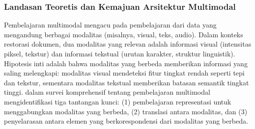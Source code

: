 \documentclass[12pt,a4paper]{article}
\begin{document}
\subsubsection{Landasan Teoretis dan Kemajuan Arsitektur Multimodal}
\label{subsubsec:theoretical-foundation-multimodal}
Pembelajaran multimodal mengacu pada pembelajaran dari data yang mengandung berbagai modalitas (misalnya, visual, teks, audio). Dalam konteks restorasi dokumen, dua modalitas yang relevan adalah informasi visual (intensitas piksel, tekstur) dan informasi tekstual (urutan karakter, struktur linguistik). Hipotesis inti adalah bahwa modalitas yang berbeda memberikan informasi yang saling melengkapi: modalitas visual mendeteksi fitur tingkat rendah seperti tepi dan tekstur, sementara modalitas tekstual memberikan batasan semantik tingkat tinggi. \parencite{baltrusaitis2019} dalam survei komprehensif tentang pembelajaran multimodal mengidentifikasi tiga tantangan kunci: (1) pembelajaran representasi untuk menggabungkan modalitas yang berbeda, (2) translasi antara modalitas, dan (3) penyelarasan antara elemen yang berkorespondensi dari modalitas yang berbeda.
\end{document}
